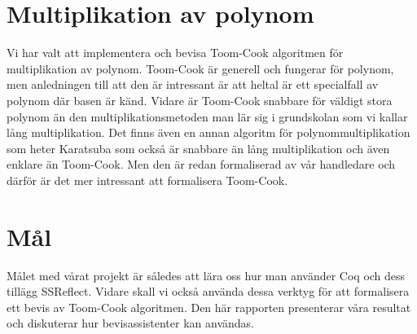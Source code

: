 \section{Multiplikation av polynom}
Vi har valt att implementera och bevisa Toom-Cook algoritmen för multiplikation
av polynom. Toom-Cook är generell och fungerar för polynom, men anledningen
till att den är intressant är att heltal är ett specialfall av polynom där
basen är känd. Vidare är Toom-Cook snabbare för väldigt stora polynom än den
multiplikationsmetoden man lär sig i grundskolan som vi kallar lång
multiplikation. Det finns även en annan algoritm för polynommultiplikation som
heter Karatsuba som också är snabbare än lång multiplikation och även enklare
än Toom-Cook. Men den är redan formaliserad av vår handledare och därför är det
mer intressant att formalisera Toom-Cook.

\section{Mål}
Målet med vårat projekt är således att lära oss hur man använder Coq och dess
tillägg SSReflect. Vidare skall vi också använda dessa verktyg för att
formalisera ett bevis av Toom-Cook algoritmen. Den här rapporten presenterar
våra resultat och diskuterar hur bevisassistenter kan användas.
